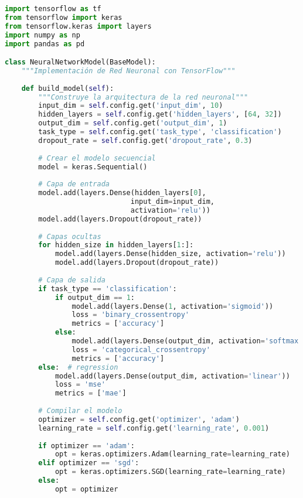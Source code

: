 \begin{lstlisting}[language=Python, caption=Implementación de red neuronal con TensorFlow]
import tensorflow as tf
from tensorflow import keras
from tensorflow.keras import layers
import numpy as np
import pandas as pd

class NeuralNetworkModel(BaseModel):
    """Implementación de Red Neuronal con TensorFlow"""
    
    def build_model(self):
        """Construye la arquitectura de la red neuronal"""
        input_dim = self.config.get('input_dim', 10)
        hidden_layers = self.config.get('hidden_layers', [64, 32])
        output_dim = self.config.get('output_dim', 1)
        task_type = self.config.get('task_type', 'classification')
        dropout_rate = self.config.get('dropout_rate', 0.3)
        
        # Crear el modelo secuencial
        model = keras.Sequential()
        
        # Capa de entrada
        model.add(layers.Dense(hidden_layers[0], 
                              input_dim=input_dim, 
                              activation='relu'))
        model.add(layers.Dropout(dropout_rate))
        
        # Capas ocultas
        for hidden_size in hidden_layers[1:]:
            model.add(layers.Dense(hidden_size, activation='relu'))
            model.add(layers.Dropout(dropout_rate))
        
        # Capa de salida
        if task_type == 'classification':
            if output_dim == 1:
                model.add(layers.Dense(1, activation='sigmoid'))
                loss = 'binary_crossentropy'
                metrics = ['accuracy']
            else:
                model.add(layers.Dense(output_dim, activation='softmax'))
                loss = 'categorical_crossentropy'
                metrics = ['accuracy']
        else:  # regression
            model.add(layers.Dense(output_dim, activation='linear'))
            loss = 'mse'
            metrics = ['mae']
        
        # Compilar el modelo
        optimizer = self.config.get('optimizer', 'adam')
        learning_rate = self.config.get('learning_rate', 0.001)
        
        if optimizer == 'adam':
            opt = keras.optimizers.Adam(learning_rate=learning_rate)
        elif optimizer == 'sgd':
            opt = keras.optimizers.SGD(learning_rate=learning_rate)
        else:
            opt = optimizer
        

\end{lstlisting}
